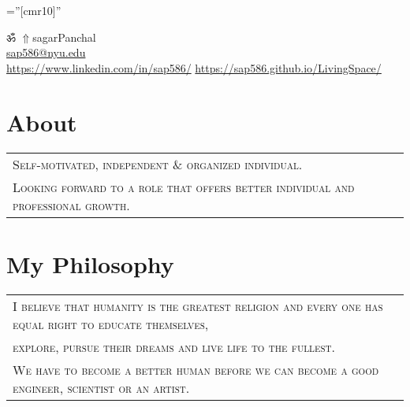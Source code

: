 \documentclass[a4paper]{article}
\newcommand{\apple}{\char"F8FF}
\begin{document}
\pagestyle{empty} 						%
\font\fb=''[cmr10]'' 						%

\par	{\centering
	ॐ
	\href{https://sap586.github.io/LivingSpace/}{$ \Uparrow$}{sagarPanchal}																								\\
	\small \href{mailto:sap586@nyu.edu}{sap586@nyu.edu}														\\
	\small \href{https://www.linkedin.com/in/sap586/}{https://www.linkedin.com/in/sap586/}		\textbullet \href{https://sap586.github.io/LivingSpace/}{https://sap586.github.io/LivingSpace/}		\par}
	
\section	{	About		}

	\begin{tabular}{lr}
		\textsc{	Self-motivated, independent \& organized individual.																}\\
		\textsc{	Looking forward to a role that offers better individual and professional growth.																}
	\end{tabular}
	\begin{spacing}{0.5}
	\end{spacing}

	
\section	{	My Philosophy		}

	\begin{tabular}{lr}
		\textsc{	I believe that humanity is the greatest religion and every one has equal right to educate themselves,													}\\
		\textsc{	explore, pursue their dreams and live life to the fullest.		}\\
		\textsc{	We have to become a better human before we can become a good engineer, scientist or an artist.													}
	\end{tabular}
	\begin{spacing}{0.5}
	\end{spacing}
\end{document}
